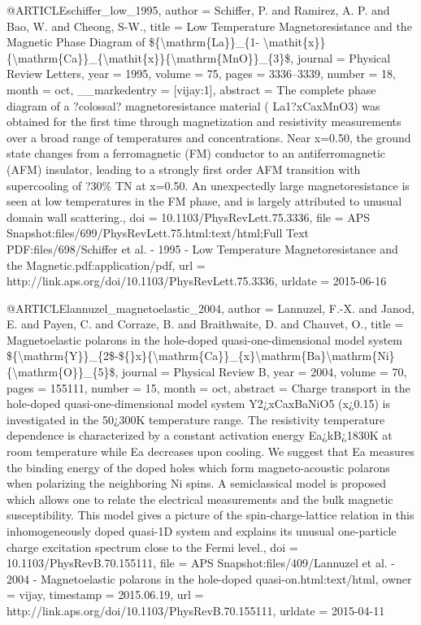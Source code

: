 @ARTICLE{schiffer_low_1995,
  author = {Schiffer, P. and Ramirez, A. P. and Bao, W. and Cheong, S-W.},
  title = {Low {Temperature} {Magnetoresistance} and the {Magnetic} {Phase}
	{Diagram} of \$\{{\textbackslash}mathrm\{{La}\}\}\_\{1- {\textbackslash}mathit\{x\}\}\{{\textbackslash}mathrm\{{Ca}\}\}\_\{{\textbackslash}mathit\{x\}\}\{{\textbackslash}mathrm\{{MnO}\}\}\_\{3\}\$},
  journal = {Physical Review Letters},
  year = {1995},
  volume = {75},
  pages = {3336--3339},
  number = {18},
  month = oct,
  __markedentry = {[vijay:1]},
  abstract = {The complete phase diagram of a ?colossal? magnetoresistance material
	( La1?xCaxMnO3) was obtained for the first time through magnetization
	and resistivity measurements over a broad range of temperatures and
	concentrations. Near x=0.50, the ground state changes from a ferromagnetic
	(FM) conductor to an antiferromagnetic (AFM) insulator, leading to
	a strongly first order AFM transition with supercooling of ?30\%
	TN at x=0.50. An unexpectedly large magnetoresistance is seen at
	low temperatures in the FM phase, and is largely attributed to unusual
	domain wall scattering.},
  doi = {10.1103/PhysRevLett.75.3336},
  file = {APS Snapshot:files/699/PhysRevLett.75.html:text/html;Full Text PDF:files/698/Schiffer et al. - 1995 - Low Temperature Magnetoresistance and the Magnetic.pdf:application/pdf},
  url = {http://link.aps.org/doi/10.1103/PhysRevLett.75.3336},
  urldate = {2015-06-16}
}

@ARTICLE{lannuzel_magnetoelastic_2004,
  author = {Lannuzel, F.-X. and Janod, E. and Payen, C. and Corraze, B. and Braithwaite,
	D. and Chauvet, O.},
  title = {Magnetoelastic polarons in the hole-doped quasi-one-dimensional model
	system \$\{{\textbackslash}mathrm\{{Y}\}\}\_\{2\$-\$\{\}x\}\{{\textbackslash}mathrm\{{Ca}\}\}\_\{x\}{\textbackslash}mathrm\{{Ba}\}{\textbackslash}mathrm\{{Ni}\}\{{\textbackslash}mathrm\{{O}\}\}\_\{5\}\$},
  journal = {Physical Review B},
  year = {2004},
  volume = {70},
  pages = {155111},
  number = {15},
  month = oct,
  abstract = {Charge transport in the hole-doped quasi-one-dimensional model system
	Y2¿xCaxBaNiO5 (x¿0.15) is investigated in the 50¿300K temperature
	range. The resistivity temperature dependence is characterized by
	a constant activation energy Ea¿kB¿1830K at room temperature
	while Ea decreases upon cooling. We suggest that Ea measures the
	binding energy of the doped holes which form magneto-acoustic polarons
	when polarizing the neighboring Ni spins. A semiclassical model is
	proposed which allows one to relate the electrical measurements and
	the bulk magnetic susceptibility. This model gives a picture of the
	spin-charge-lattice relation in this inhomogeneously doped quasi-1D
	system and explains its unusual one-particle charge excitation spectrum
	close to the Fermi level.},
  doi = {10.1103/PhysRevB.70.155111},
  file = {APS Snapshot:files/409/Lannuzel et al. - 2004 - Magnetoelastic polarons in the hole-doped quasi-on.html:text/html},
  owner = {vijay},
  timestamp = {2015.06.19},
  url = {http://link.aps.org/doi/10.1103/PhysRevB.70.155111},
  urldate = {2015-04-11}
}

